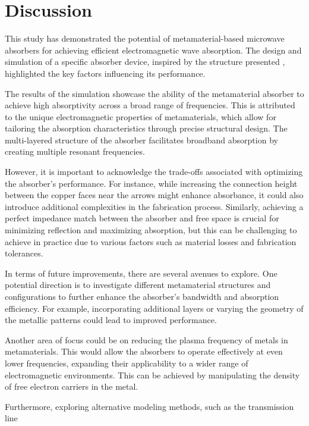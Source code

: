 \section{\textsf{Discussion}}
    \par This study has demonstrated the potential of metamaterial-based microwave absorbers
    for achieving efficient electromagnetic wave absorption. The design and simulation of
    a specific absorber device, inspired by the structure presented \cite{zhang_design_2023},
    highlighted the key factors influencing its performance.
    \par The results of the simulation showcase the ability of the metamaterial absorber to
    achieve high absorptivity across a broad range of frequencies. This is attributed to
    the unique electromagnetic properties of metamaterials, which allow for tailoring the
    absorption characteristics through precise structural design. The multi-layered
    structure of the absorber facilitates broadband absorption by creating multiple
    resonant frequencies.
    \par However, it is important to acknowledge the trade-offs associated with optimizing the
    absorber's performance. For instance, while increasing the connection height between
    the copper faces near the arrows might enhance absorbance, it could also introduce
    additional complexities in the fabrication process. Similarly, achieving a perfect
    impedance match between the absorber and free space is crucial for minimizing
    reflection and maximizing absorption, but this can be challenging to achieve in
    practice due to various factors such as material losses and fabrication tolerances.
    \par In terms of future improvements, there are several avenues to explore. One potential
    direction is to investigate different metamaterial structures and configurations to
    further enhance the absorber's bandwidth and absorption efficiency. For example,
    incorporating additional layers or varying the geometry of the metallic patterns could
    lead to improved performance.
    \par Another area of focus could be on reducing the plasma frequency of metals in
    metamaterials. This would allow the absorbers to operate effectively at even lower
    frequencies, expanding their applicability to a wider range of electromagnetic
    environments.  This can be achieved by manipulating the density of free electron
    carriers in the metal.
    \par Furthermore, exploring alternative modeling methods, such as the transmission line
